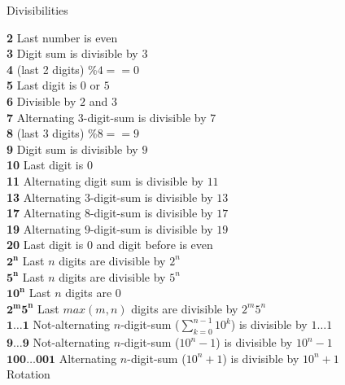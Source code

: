 \documentclass[a4paper,twocolumn]{article}
\begin{document}
\newpage
\vspace{10pt}
\centering\Huge{Divisibilities}
\vspace{20pt}
\endgroup

\normalsize
{}
\textbf{2}   Last number is even \\
\textbf{3}   Digit sum is divisible by $3$ \\
\textbf{4}   (last 2 digits) $\% 4 == 0$ \\
\textbf{5}   Last digit is $0$ or $5$ \\
\textbf{6}   Divisible by $2$ and $3$ \\
\textbf{7}   Alternating 3-digit-sum is divisible by $7$ \\
\textbf{8}   (last 3 digits) $\% 8 == 9$ \\
\textbf{9}   Digit sum is divisible by $9$ \\
\textbf{10}  Last digit is $0$ \\
\textbf{11}  Alternating digit sum is divisible by $11$ \\
\textbf{13}  Alternating $3$-digit-sum is divisible by $13$ \\
\textbf{17}  Alternating $8$-digit-sum is divisible by $17$ \\
\textbf{19}  Alternating $9$-digit-sum is divisible by $19$ \\
\textbf{20}  Last digit is $0$ and digit before is even \\

$\mathbf{2^n}$      Last $n$ digits are divisible by $2^n$ \\
$\mathbf{5^n}$      Last $n$ digits are divisible by $5^n$ \\
$\mathbf{10^n}$     Last $n$ digits are $0$ \\
$\mathbf{2^m5^n}$   Last $max(m, n)$ digits are divisible by $2^m5^n$ \\
$\mathbf{1\ldots1}$ Not-alternating $n$-digit-sum
                    ($\sum_{k=0}^{n-1} 10^k$) is divisible by $1\ldots1$
                    \\
$\mathbf{9\ldots9}$ Not-alternating $n$-digit-sum ($10^n - 1$)
                    is divisible by $10^n - 1$ \\
$\mathbf{100\ldots001}$ Alternating $n$-digit-sum ($10^n + 1$) is
                        divisible by $10^n + 1$ \\


\vspace{10pt}
\centering\Huge{Rotation}
\vspace{20pt}
\end{document}
